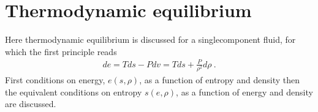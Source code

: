 \documentclass[letterpaper,10pt,english]{jupyterBook}
\begin{document}
\section{Thermodynamic equilibrium}
\label{\detokenize{ch/coefficients:thermodynamic-equilibrium}}
\sphinxAtStartPar
Here thermodynamic equilibrium is discussed for a single\sphinxhyphen{}component fluid, for which the first principle reads
\begin{equation*}
\begin{split}d e = T ds - P dv = T ds + \frac{P}{\rho^2} d \rho \ .\end{split}
\end{equation*}
\sphinxAtStartPar
First conditions on energy, \(e(s, \rho)\), as a function of entropy and density then the equivalent conditions on entropy \(s(e, \rho)\), as a function of energy and density are discussed.
\end{document}
